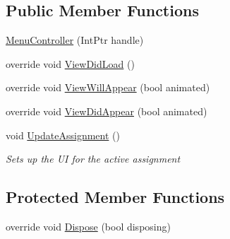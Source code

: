 \subsection*{Public Member Functions}
\begin{DoxyCompactItemize}
\item 
\hyperlink{class_field_service_1_1i_o_s_1_1_menu_controller_aa381cc389506b647abd1e16a8bc3ec23}{Menu\+Controller} (Int\+Ptr handle)
\item 
override void \hyperlink{class_field_service_1_1i_o_s_1_1_menu_controller_a68604c79f2e98ab71a54d152c98fd22e}{View\+Did\+Load} ()
\item 
override void \hyperlink{class_field_service_1_1i_o_s_1_1_menu_controller_a23c22e08c2699811e5ecb7844877f53e}{View\+Will\+Appear} (bool animated)
\item 
override void \hyperlink{class_field_service_1_1i_o_s_1_1_menu_controller_a9c0b5be54e7db0acc82d53dffd99528f}{View\+Did\+Appear} (bool animated)
\item 
void \hyperlink{class_field_service_1_1i_o_s_1_1_menu_controller_a13e6652edcfb8992c14ed6c6859027b0}{Update\+Assignment} ()
\begin{DoxyCompactList}\small\item\em Sets up the U\+I for the active assignment \end{DoxyCompactList}\end{DoxyCompactItemize}
\subsection*{Protected Member Functions}
\begin{DoxyCompactItemize}
\item 
override void \hyperlink{class_field_service_1_1i_o_s_1_1_menu_controller_a9b628d7091ba526a3986660be526372a}{Dispose} (bool disposing)
\end{DoxyCompactItemize}
